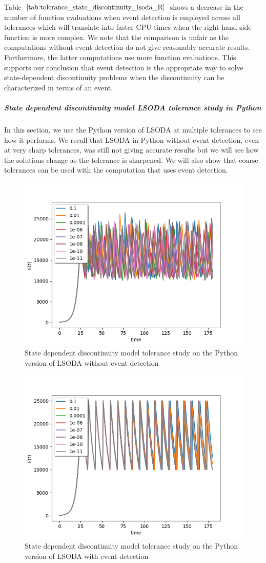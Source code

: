 Table $\ref{tab:tolerance_state_discontinuity_lsoda_R}$ shows a decrease in the number of function evaluations when event detection is employed across all tolerances which will translate into faster CPU times when the right-hand side function is more complex. We note that the comparison is unfair as the computations without event detection do not give reasonably accurate results. Furthermore, the latter computations use more function evaluations. This supports our conclusion that event detection is the appropriate way to solve state-dependent discontinuity problems when the discontinuity can be characterized in terms of an event.

\subparagraph{State dependent discontinuity model LSODA tolerance study in Python}
In this section, we use the Python version of LSODA at multiple tolerances to see how it performs. We recall that LSODA in Python without event detection, even at very sharp tolerances, was still not giving accurate results but we will see how the solutions change as the tolerance is sharpened. We will also show that coarse tolerances can be used with the computation that uses event detection. 

\begin{figure}[h]
\centering
\includegraphics[width=0.7\linewidth]{./figures/tolerance_state_lsoda_no_event_py}
\caption{State dependent discontinuity model tolerance study on the Python version of LSODA without event detection}
\label{fig:tolerance_state_lsoda_no_event_py}
\end{figure}

\begin{figure}[h]
\centering
\includegraphics[width=0.7\linewidth]{./figures/tolerance_state_lsoda_with_event_py}
\caption{State dependent discontinuity model tolerance study on the Python version of LSODA with event detection}
\label{fig:tolerance_state_lsoda_with_event_py}
\end{figure}

